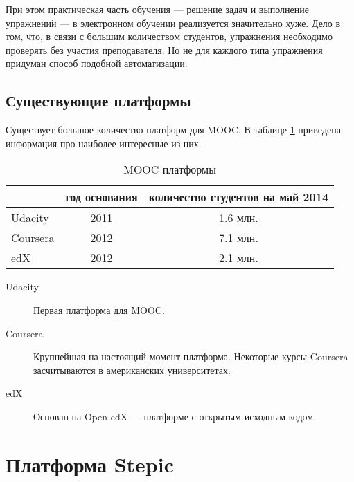 \documentclass{matmex-diploma-custom}
\begin{document}
При этом практическая часть обучения --- решение задач и выполнение
упражнений --- в электронном обучении реализуется значительно хуже.
Дело в том, что, в связи с большим количеством студентов, упражнения
необходимо проверять без участия преподавателя. Но не для каждого типа
упражнения придуман способ подобной автоматизации.

\subsection*{Существующие платформы}

Существует большое количество платформ для MOOC. В таблице
\ref{table:platforms} приведена информация про наиболее интересные из
них.

\begin{table}[t]
  \centering
\begin{tabular}{|l|c|c|}
\hline
 & год основания & количество студентов на май 2014 \\
\hline
Udacity & 2011 & 1.6 млн. \\
Coursera & 2012 & 7.1 млн. \\
edX & 2012 & 2.1 млн. \\
\hline
\end{tabular}
  \caption{MOOC платформы}
   \label{table:platforms}
\end{table}

\iffalse
#+ORGTBL: SEND plat orgtbl-to-latex :splice nil :skip 0
|----------+---------------+----------------------------------|
|          | год основания | количество студентов на май 2014 |
|----------+---------------+----------------------------------|
| Udacity  |          2011 | 1.6 млн.                         |
| Coursera |          2012 | 7.1 млн.                         |
| edX      |          2012 | 2.1 млн.                         |
|----------+---------------+----------------------------------|
\fi

\begin{description}
\item[Udacity] Первая платформа для MOOC.
\item[Coursera] Крупнейшая на настоящий момент платформа. Некоторые
  курсы Coursera засчитываются в американских университетах.
\item[edX] Основан на Open edX --- платформе с открытым исходным кодом.
\end{description}

\section{Платформа Stepic}
\end{document}
